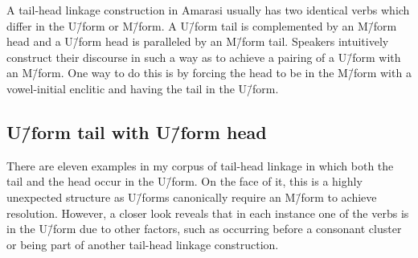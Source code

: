 \begin{exe}
\end{exe}

A tail-head linkage construction in Amarasi usually
has two identical verbs which differ in the U\=/form or M\=/form.
A U\=/form tail is complemented by an M\=/form head
and a U\=/form head is paralleled by an M\=/form tail.
Speakers intuitively construct their discourse in such
a way as to achieve a pairing of a U\=/form with an M\=/form.
One way to do this is by forcing the head to be in the M\=/form
with a vowel-initial enclitic and having the tail in the U\=/form.

\subsection{U\=/form tail with U\=/form head}\label{sec:UforTaiUforHea}
There are eleven examples in my corpus of tail-head linkage
in which both the tail and the head occur in the U\=/form.
On the face of it, this is a highly unexpected structure
as U\=/forms canonically require an M\=/form to achieve resolution.
However, a closer look reveals that in each instance one of the verbs is in the U\=/form due to
other factors, such as occurring before a consonant cluster
or being part of another tail-head linkage construction.

